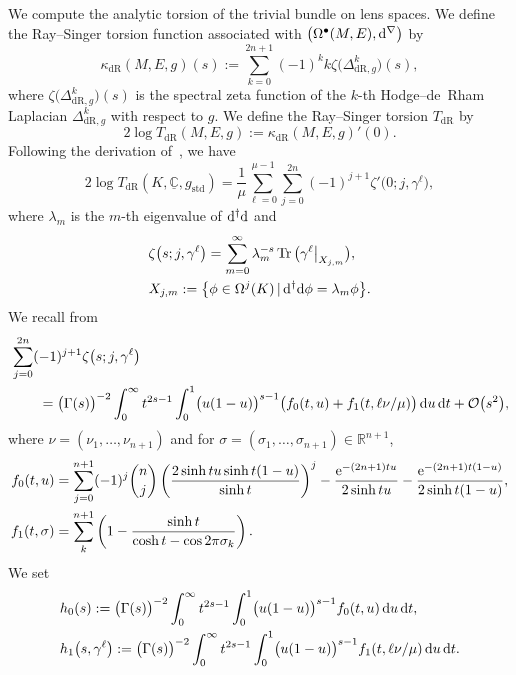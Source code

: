 \documentclass[10pt,a4paper]{amsart}
\numberwithin{equation}{section}
\DeclareMathOperator{\Tr}{Tr}
\newcommand{\adjoint}{\dagger}
\newcommand{\deRham}{\mathrm{dR}}
\newcommand{\bR}{\mathbb{R}}
\newcommand{\bC}{\mathbb{C}}
\newcommand{\rest}[1]{\big\rvert_{#1}}
\begin{document}
We compute the analytic torsion of the trivial bundle on lens spaces.
We define the Ray--Singer torsion function associated with $\big(\Omega^{\bullet}(M,E) , {\rm d}^{\nabla}\big)$ by
\[
 \kappa_{\deRham} (M, E , g ) (s)
 := \sum_{k=0}^{2n+1} (-1)^k k \zeta \big(\Delta_{\deRham , g}^k \big) (s )
 ,
\]
where $\zeta \big(\Delta_{\deRham , g}^k \big) (s )$ is the spectral zeta function of the $k$-th Hodge--de~Rham Laplacian $\Delta_{\deRham , g}^k$
with respect to $g$.
We define the Ray--Singer torsion $T_{\deRham}$
by
\[
 2 \log T_{\deRham} (M, E , g )
 := \kappa_{\deRham} (M, E , g )' (0)
 .
\]
Following the derivation of~\cite[equation (3)]{Ray-70}, we have
\[
 2 \log T_{\deRham} ( K , \underline{\bC} , g_{\mathrm{std}} )
 =
 \frac{1}{\mu}
 \sum_{\ell = 0}^{\mu -1}
 \sum_{j=0}^{2n}
 (-1)^{j+1}
 \zeta ' \big(0 ; j, \gamma^{\ell} \big)
 ,
\]
where $\lambda_m$ is the $m$-th eigenvalue of ${\rm d}^{\adjoint} {\rm d}$
and
\begin{align*}
& \zeta \big(s ; j, \gamma^{\ell} \big)
 =
 \sum_{m=0}^{\infty}
 \lambda_m^{-s} \Tr \big( \gamma^{\ell} \rest{X_{j,m}}\big)
 ,
 \\
& X_{j,m}
 :=
 \big\{
 \phi \in \Omega^j (K)
 \,|\,
{\rm d}^{\adjoint} {\rm d} \phi = \lambda_m \phi
 \big\}
 .
\end{align*}
We recall from~\cite[p.~123]{Ray-70}
\begin{align*}
 &
 \sum_{j=0}^{2n}
 (-1)^{j+1}
 \zeta \big(s ; j, \gamma^{\ell} \big)
 \\
 & \qquad=
 \big(\Gamma (s)\big)^{-2}
 \int_0^{\infty} t^{2s-1}
 \int_0^1 \bigl( u(1-u) \bigr)^{s-1}
 \big(
 f_{0} (t, u)
 + f_{1} (t , \ell \nu / \mu )
 \big) \, {\rm d}u \, {\rm d}t
 + \mathcal{O} \big(s^2\big)
 ,
\end{align*}
where $\nu = (\nu_1 , \ldots , \nu_{n+1}) $ and for $\sigma = (\sigma_1 , \ldots , \sigma_{n+1} )\in \bR^{n+1}$,
\begin{align*}
 f_{0} (t, u)
 & =
 \sum_{j=0}^{n+1}
 (-1)^{j} \binom{n}{j}
 \left(
 \frac{
 2 \sinh t u \sinh t (1-u)
 }{
 \sinh t
 }
 \right)^{j}
 - \frac{{\rm e}^{-(2n+1)tu}}{2 \sinh tu}
 - \frac{{\rm e}^{-(2n+1)t(1-u)}}{2 \sinh t(1-u)}
 ,
 \\
 f_{1} (t , \sigma )
 & =
 \sum_{k}^{n+1}
 \left(
 1
 -
 \frac{
 \sinh t
 }{
 \cosh t - \cos 2 \pi \sigma_k
 }
 \right)
 .
\end{align*}
We set
\begin{align*}
& h_0 (s) :=
 \big(\Gamma (s)\big)^{-2}
 \int_0^{\infty} t^{2s-1}
 \int_0^1 \bigl( u(1-u) \bigr)^{s-1}
 f_0 (t,u ) \, {\rm d}u \, {\rm d}t
 ,
 \\
& h_1 \big(s , \gamma^{\ell}\big) :=
 \big(\Gamma (s)\big)^{-2}
 \int_0^{\infty} t^{2s-1}
 \int_0^1 \bigl( u(1-u) \bigr)^{s-1}
 f_1 (t, \ell \nu/\mu ) \, {\rm d}u \, {\rm d}t
 .
\end{align*}
\end{document}
